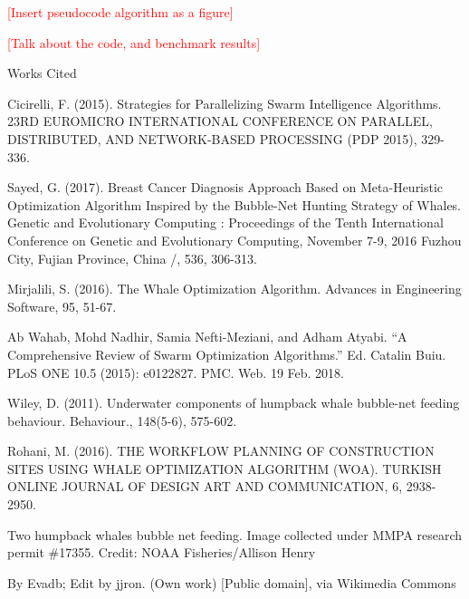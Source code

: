 \documentclass[11pt]{article}
\newcommand{\bibent}{\noindent \hangindent 40pt}
\newenvironment{workscited}{\newpage \begin{center} Works Cited \end{center}}{\newpage }
\newcommand{\TODO}[1]{\textcolor{red}{[#1]}}
\begin{document}
\TODO{Insert pseudocode algorithm as a figure}

\TODO{Talk about the code, and benchmark results}


\begin{workscited}

\bibent
Cicirelli, F. (2015). Strategies for Parallelizing Swarm Intelligence Algorithms. 23RD EUROMICRO INTERNATIONAL CONFERENCE ON PARALLEL, DISTRIBUTED, AND NETWORK-BASED PROCESSING (PDP 2015), 329-336.

\bibent
Sayed, G. (2017). Breast Cancer Diagnosis Approach Based on Meta-Heuristic Optimization Algorithm Inspired by the Bubble-Net Hunting Strategy of Whales. Genetic and Evolutionary Computing : Proceedings of the Tenth International Conference on Genetic and Evolutionary Computing, November 7-9, 2016 Fuzhou City, Fujian Province, China /, 536, 306-313.

\bibent
Mirjalili, S. (2016). The Whale Optimization Algorithm. Advances in Engineering Software, 95, 51-67.

\bibent
Ab Wahab, Mohd Nadhir, Samia Nefti-Meziani, and Adham Atyabi. “A Comprehensive Review of Swarm Optimization Algorithms.” Ed. Catalin Buiu. PLoS ONE 10.5 (2015): e0122827. PMC. Web. 19 Feb. 2018.

\bibent
Wiley, D. (2011). Underwater components of humpback whale bubble-net feeding behaviour. Behaviour., 148(5-6), 575-602.

\bibent
Rohani, M. (2016). THE WORKFLOW PLANNING OF CONSTRUCTION SITES USING WHALE OPTIMIZATION ALGORITHM (WOA). TURKISH ONLINE JOURNAL OF DESIGN ART AND COMMUNICATION, 6, 2938-2950.

\bibent %
Two humpback whales bubble net feeding. Image collected under MMPA research permit \#17355.
Credit: NOAA Fisheries/Allison Henry

\bibent %
By Evadb; Edit by jjron. (Own work) [Public domain], via Wikimedia Commons

\end{workscited}
\end{document}
